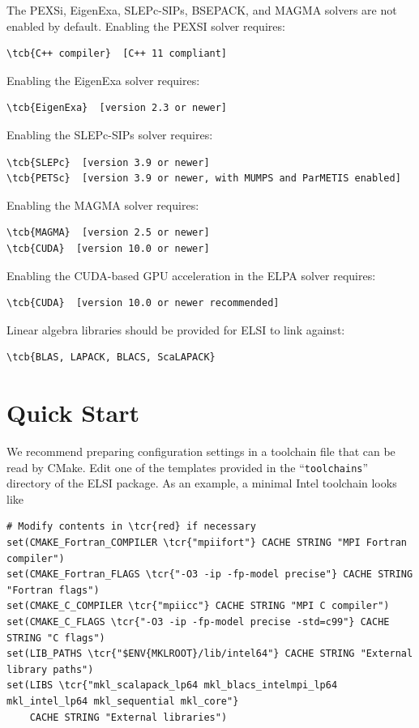 \documentclass{report}
\newcommand{\tcb}[1]{\textcolor{blue}{#1}}
\newcommand{\tcr}[1]{\textcolor{red}{#1}}
\begin{document}
The PEXSi, EigenExa, SLEPc-SIPs, BSEPACK, and MAGMA solvers are not enabled by default. Enabling the PEXSI solver requires:
\begin{Verbatim}[commandchars=\\\{\}]
\tcb{C++ compiler}  [C++ 11 compliant]
\end{Verbatim}

Enabling the EigenExa solver requires:
\begin{Verbatim}[commandchars=\\\{\}]
\tcb{EigenExa}  [version 2.3 or newer]
\end{Verbatim}

Enabling the SLEPc-SIPs solver requires:
\begin{Verbatim}[commandchars=\\\{\}]
\tcb{SLEPc}  [version 3.9 or newer]
\tcb{PETSc}  [version 3.9 or newer, with MUMPS and ParMETIS enabled]
\end{Verbatim}

Enabling the MAGMA solver requires:
\begin{Verbatim}[commandchars=\\\{\}]
\tcb{MAGMA}  [version 2.5 or newer]
\tcb{CUDA}  [version 10.0 or newer]
\end{Verbatim}

Enabling the CUDA-based GPU acceleration in the ELPA solver requires:
\begin{Verbatim}[commandchars=\\\{\}]
\tcb{CUDA}  [version 10.0 or newer recommended]
\end{Verbatim}

Linear algebra libraries should be provided for ELSI to link against:
\begin{Verbatim}[commandchars=\\\{\}]
\tcb{BLAS, LAPACK, BLACS, ScaLAPACK}
\end{Verbatim}

\section{Quick Start}
\label{sec:quick}
We recommend preparing configuration settings in a toolchain file that can be read by CMake. Edit one of the templates provided in the ``\texttt{toolchains}'' directory of the ELSI package. As an example, a minimal Intel toolchain looks like
\begin{tcolorbox}
\begin{Verbatim}[commandchars=\\\{\}]
# Modify contents in \tcr{red} if necessary
set(CMAKE_Fortran_COMPILER \tcr{"mpiifort"} CACHE STRING "MPI Fortran compiler")
set(CMAKE_Fortran_FLAGS \tcr{"-O3 -ip -fp-model precise"} CACHE STRING "Fortran flags")
set(CMAKE_C_COMPILER \tcr{"mpiicc"} CACHE STRING "MPI C compiler")
set(CMAKE_C_FLAGS \tcr{"-O3 -ip -fp-model precise -std=c99"} CACHE STRING "C flags")
set(LIB_PATHS \tcr{"$ENV{MKLROOT}/lib/intel64"} CACHE STRING "External library paths")
set(LIBS \tcr{"mkl_scalapack_lp64 mkl_blacs_intelmpi_lp64 mkl_intel_lp64 mkl_sequential mkl_core"}
    CACHE STRING "External libraries")
\end{Verbatim}
\end{tcolorbox}
\end{document}
